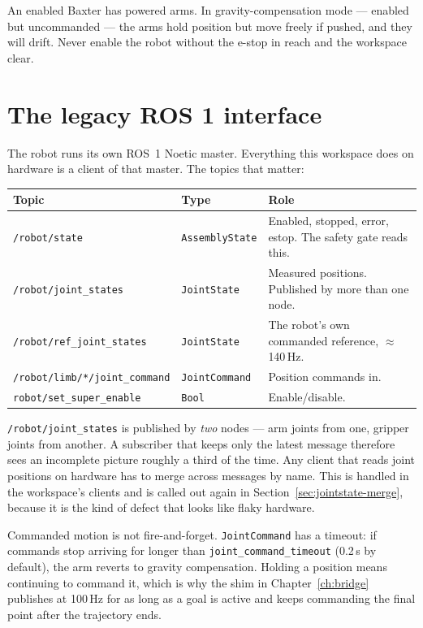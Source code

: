 \begin{safetybox}
An enabled Baxter has powered arms. In gravity-compensation mode --- enabled but
uncommanded --- the arms hold position but move freely if pushed, and they will
drift. Never enable the robot without the e-stop in reach and the workspace clear.
\end{safetybox}

\section{The legacy ROS 1 interface}

The robot runs its own ROS~1 Noetic master. Everything this workspace does on
hardware is a client of that master. The topics that matter:

\begin{table}[h]
\centering
\small
\begin{tabularx}{\linewidth}{@{}llX@{}}
\toprule
\textbf{Topic} & \textbf{Type} & \textbf{Role} \\
\midrule
\texttt{/robot/state} & \texttt{AssemblyState} & Enabled, stopped, error, estop. The safety gate reads this. \\
\texttt{/robot/joint\_states} & \texttt{JointState} & Measured positions. Published by more than one node. \\
\texttt{/robot/ref\_joint\_states} & \texttt{JointState} & The robot's own commanded reference, $\approx$140\,Hz. \\
\texttt{/robot/limb/*/joint\_command} & \texttt{JointCommand} & Position commands in. \\
\texttt{robot/set\_super\_enable} & \texttt{Bool} & Enable/disable. \\
\bottomrule
\end{tabularx}
\end{table}

\begin{notebox}
\texttt{/robot/joint\_states} is published by \emph{two} nodes --- arm joints from
one, gripper joints from another. A subscriber that keeps only the latest message
therefore sees an incomplete picture roughly a third of the time. Any client that
reads joint positions on hardware has to merge across messages by name. This is
handled in the workspace's clients and is called out again in
Section~\ref{sec:jointstate-merge}, because it is the kind of defect that looks
like flaky hardware.
\end{notebox}

Commanded motion is not fire-and-forget. \texttt{JointCommand} has a timeout: if
commands stop arriving for longer than \texttt{joint\_command\_timeout}
(0.2\,s by default), the arm reverts to gravity compensation. Holding a position
means continuing to command it, which is why the shim in
Chapter~\ref{ch:bridge} publishes at 100\,Hz for as long as a goal is active and
keeps commanding the final point after the trajectory ends.
